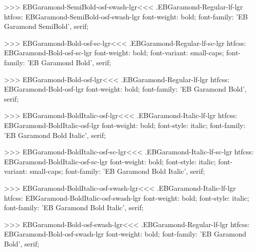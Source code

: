 >>>
\<EBGaramond-SemiBold-osf-swash-lgr\><<<
.EBGaramond-Regular-lf-lgr
htfcss:  EBGaramond-SemiBold-osf-swash-lgr  font-weight: bold; font-family: 'EB Garamond SemiBold', serif;

>>>
\<EBGaramond-Bold-osf-sc-lgr\><<<
.EBGaramond-Regular-lf-sc-lgr
htfcss:  EBGaramond-Bold-osf-sc-lgr  font-weight: bold; font-variant: small-caps; font-family: 'EB Garamond Bold', serif;

>>>
\<EBGaramond-Bold-osf-lgr\><<<
.EBGaramond-Regular-lf-lgr
htfcss:  EBGaramond-Bold-osf-lgr  font-weight: bold; font-family: 'EB Garamond Bold', serif;

>>>
\<EBGaramond-BoldItalic-osf-lgr\><<<
.EBGaramond-Italic-lf-lgr
htfcss:  EBGaramond-BoldItalic-osf-lgr  font-weight: bold; font-style: italic; font-family: 'EB Garamond Bold Italic', serif;

>>>
\<EBGaramond-BoldItalic-osf-sc-lgr\><<<
.EBGaramond-Italic-lf-sc-lgr
htfcss:  EBGaramond-BoldItalic-osf-sc-lgr  font-weight: bold; font-style: italic; font-variant: small-caps; font-family: 'EB Garamond Bold Italic', serif;

>>>
\<EBGaramond-BoldItalic-osf-swash-lgr\><<<
.EBGaramond-Italic-lf-lgr
htfcss:  EBGaramond-BoldItalic-osf-swash-lgr  font-weight: bold; font-style: italic; font-family: 'EB Garamond Bold Italic', serif;

>>>
\<EBGaramond-Bold-osf-swash-lgr\><<<
.EBGaramond-Regular-lf-lgr
htfcss:  EBGaramond-Bold-osf-swash-lgr  font-weight: bold; font-family: 'EB Garamond Bold', serif;

